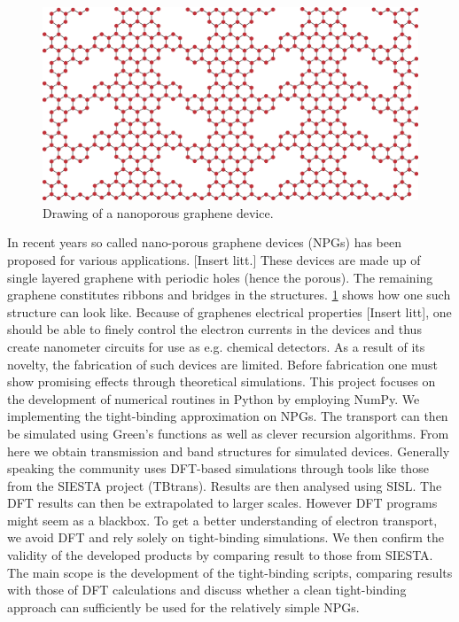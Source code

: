 \begin{figure}
	\vspace{-2.3em}
	\centering
	\includegraphics[width=.4\textwidth]{Figures/NPGintroGraphic.eps}
    \caption{Drawing of a nanoporous graphene device.}\label{introGraphic}
\end{figure}
In recent years so called nano-porous graphene devices (NPGs) has been proposed for various applications. [Insert litt.] These devices are made up of single layered graphene with periodic holes (hence the porous). The remaining graphene constitutes ribbons and bridges in the structures. \cref{introGraphic} shows how one such structure can look like.
Because of graphenes electrical properties [Insert litt], one should be able to finely control the electron currents in the devices and thus create nanometer circuits for use as e.g. chemical detectors. As a result of its novelty, the fabrication of such devices are limited. Before fabrication one must show promising effects through theoretical simulations.\newline
This project focuses on the development of numerical routines in Python by employing NumPy. We implementing the tight-binding approximation on NPGs. The transport can then be simulated using Green's functions as well as clever recursion algorithms. From here we obtain transmission and band structures for simulated devices.\newline
Generally speaking the community uses DFT-based simulations through tools like those from the SIESTA project (TBtrans). Results are then analysed using SISL\cite{zerothi_sisl}. The DFT results can then be extrapolated to larger scales\cite{calogero_electron_2019}. However DFT programs might seem as a blackbox. To get a better understanding of electron transport, we avoid DFT and rely solely on tight-binding simulations. We then confirm the validity of the developed products by comparing result to those from SIESTA.\newline
The main scope is the development of the tight-binding scripts, comparing results with those of DFT calculations and discuss whether a clean tight-binding approach can sufficiently be used for the relatively simple NPGs.\newline
